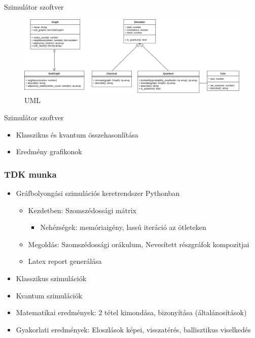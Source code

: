 \documentclass[aspectratio=169]{beamer}
\begin{document}
\begin{frame}{Szimulátor szoftver}
\begin{figure}
        \includegraphics[width=\textwidth]{./tdk_figures/program/uml.png}
        \caption{UML}
\end{figure}
\end{frame}

\begin{frame}{Szimulátor szoftver}
\begin{itemize}
    \item Klasszikus és kvantum összehasonlítása
    \item Eredmény grafikonok
\end{itemize}
\end{frame}

\begin{frame}
  \frametitle{TDK munka}
  \begin{itemize}
    \item Gráfbolyongási szimulációs keretrendszer Pythonban
    \begin{itemize}
      \item Kezdetben: Szomszédossági mátrix
      \begin{itemize}
        \item Nehézségek: memóriaigény, lassú iteráció az ötleteken
      \end{itemize}
      \item Megoldás: Szomszédossági orákulum, Nevesített részgráfok kompozitjai
      \item Latex report generálása
    \end{itemize}
    \item Klasszikus szimulációk
    \item Kvantum szimulációk
    \item Matematikai eredmények: 2 tétel kimondása, bizonyítása (általánosítások)
    \item Gyakorlati eredmények: Eloszlások képei, visszatérés, ballisztikus viselkedés
  \end{itemize}
\end{frame}
\end{document}
